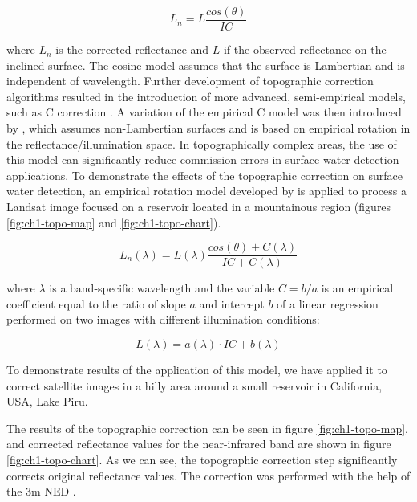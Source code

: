 \begin{equation}
\label{eq:cosine}
L_n = L \frac{cos(\theta)}{IC}
\end{equation}

where $L_n$ is the corrected reflectance and $L$ if the observed reflectance on the inclined surface. The cosine model assumes that the surface is Lambertian and is independent of wavelength. Further development of topographic correction algorithms resulted in the introduction of more advanced, semi-empirical models, such as C correction \citet{teillet1982slope}. A variation of the empirical C model was then introduced by \citet{tan2013improved}, which assumes non-Lambertian surfaces and is based on empirical rotation in the reflectance/illumination space. In topographically complex areas, the use of this model can significantly reduce commission errors in surface water detection applications. To demonstrate the effects of the topographic correction on surface water detection, an empirical rotation model developed by \citet{tan2013improved} is applied to process a Landsat image focused on a reservoir located in a mountainous region (figures \ref{fig:ch1-topo-map} and \ref{fig:ch1-topo-chart}).

\begin{equation}
\label{eq:topo-c}
L_n(\lambda) = L(\lambda) \frac{cos(\theta) + C(\lambda)}{IC + C(\lambda)}
\end{equation}

where ${\lambda}$ is a band-specific wavelength and the variable $C = b / a$ is an empirical coefficient equal to the ratio of slope $a$ and intercept $b$ of a linear regression performed on two images with different illumination conditions:

\begin{equation}
\label{eq:topo-c-regression}
L(\lambda) = a(\lambda) \cdot IC + b(\lambda)
\end{equation}

To demonstrate results of the application of this model, we have applied it to correct satellite images in a hilly area around a small reservoir in California, USA, Lake Piru. 

The results of the topographic correction can be seen in figure \ref{fig:ch1-topo-map}, and corrected reflectance values for the near-infrared band are shown in figure \ref{fig:ch1-topo-chart}. As we can see, the topographic correction step significantly corrects original reflectance values. The correction was performed with the help of the 3m \gls{NED} \cite{gesch2002national}.

